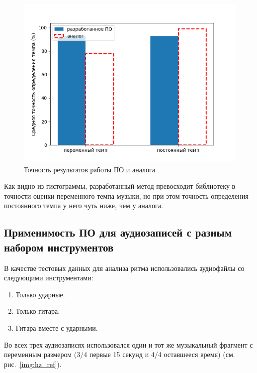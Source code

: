 \begin{figure}[h]
	\centering
	\includegraphics[scale=0.9]{../graphs/tempo_librosa.png}
	\caption{Точность результатов работы ПО и аналога}
	\label{img:tempo_librosa}
\end{figure}

Как видно из гистограммы, разработанный метод превосходит библиотеку в точности оценки переменного темпа музыки, но при этом точность определения постоянного темпа у него чуть ниже, чем у аналога.

\subsection{Применимость ПО для аудиозаписей с разным набором инструментов}

В качестве тестовых данных для анализа ритма использовались аудиофайлы со следующими инструментами:
 
\begin{enumerate}
	\item Только ударные.
	\item Только гитара.
	\item Гитара вместе с ударными.
\end{enumerate}

Во всех трех аудиозаписях использовался один и тот же музыкальный фрагмент с переменным размером (3/4 первые 15 секунд и 4/4 оставшееся время) (см. рис.~\ref{img:hz_ref}).

